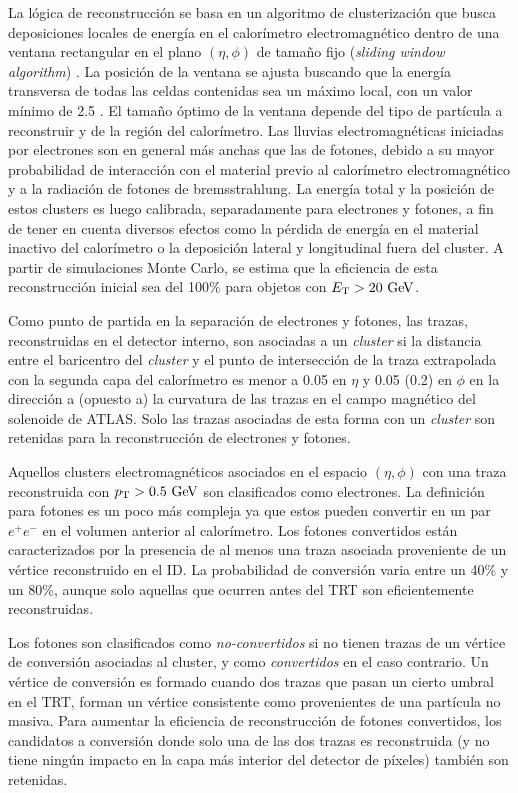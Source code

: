 La lógica de reconstrucción se basa en un algoritmo de clusterización que busca
deposiciones locales de energía en el calorímetro electromagnético dentro de una
ventana rectangular en el plano $(\eta, \phi)$ de tamaño fijo (\emph{sliding
  window algorithm}) \cite{Delmastro:1747242}. La posición de la ventana se
ajusta buscando que la energía transversa de todas las celdas contenidas sea un
máximo local, con un valor mínimo de 2.5 \gev. El tamaño óptimo de la ventana depende
del tipo de partícula a reconstruir y de la región del calorímetro. Las lluvias
electromagnéticas iniciadas por electrones son en general más anchas que las de
fotones, debido a su mayor probabilidad de interacción con el material previo al
calorímetro electromagnético y a la radiación de fotones de bremsstrahlung. La
energía total y la posición de estos clusters es luego calibrada, separadamente
para electrones y fotones, a fin de tener en cuenta diversos efectos como la
pérdida de energía en el material inactivo del calorímetro o la deposición
lateral y longitudinal fuera del cluster. A partir de simulaciones Monte Carlo,
se estima que la eficiencia de esta reconstrucción inicial sea del 100\% para
objetos con $\et > 20 \gev$.

Como punto de partida en la separación de electrones y fotones, las trazas,
reconstruidas en el detector interno, son asociadas a un \emph{cluster} si la distancia
entre el baricentro del \emph{cluster} y el punto de intersección de la traza
extrapolada con la segunda capa del calorímetro es menor a 0.05 en $\eta$ y 0.05
(0.2) en $\phi$ en la dirección a (opuesto a) la curvatura de las trazas en el
campo magnético del solenoide de ATLAS. Solo las trazas asociadas de esta forma
con un \emph{cluster} son retenidas para la reconstrucción de electrones y fotones.

Aquellos clusters electromagnéticos asociados en el espacio $(\eta,\phi)$ con
una traza reconstruida con $\pt > 0.5 \gev$ son clasificados como electrones. La
definición para fotones es un poco más compleja ya que estos pueden convertir en
un par $e^+e^-$ en el volumen anterior al calorímetro. Los fotones convertidos
están caracterizados por la presencia de al menos una traza asociada proveniente
de un vértice reconstruido en el ID. La probabilidad de conversión varia entre
un 40\% y un 80\%, aunque solo aquellas que ocurren antes del TRT son
eficientemente reconstruidas.

Los fotones son clasificados como \emph{no-convertidos} si no tienen trazas de
un vértice de conversión asociadas al cluster, y como \emph{convertidos} en el
caso contrario. Un vértice de conversión es formado cuando dos trazas que pasan
un cierto umbral en el TRT, forman un vértice consistente como provenientes de
una partícula no masiva. Para aumentar la eficiencia de reconstrucción de
fotones convertidos, los candidatos a conversión donde solo una de las dos
trazas es reconstruida (y no tiene ningún impacto en la capa más interior del
detector de píxeles) también son retenidas.

